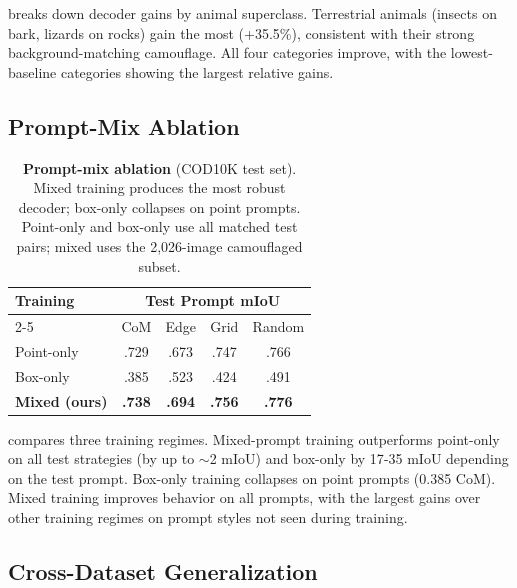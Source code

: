 \documentclass[10pt,twocolumn,letterpaper]{article}
\begin{document}
 breaks down decoder gains by animal superclass. Terrestrial animals (insects on bark, lizards on rocks) gain the most (+35.5\%), consistent with their strong background-matching camouflage. All four categories improve, with the lowest-baseline categories showing the largest relative gains.

\subsection{Prompt-Mix Ablation}

\begin{table}[t]
\centering
\caption{\textbf{Prompt-mix ablation} (COD10K test set). Mixed training produces the most robust decoder; box-only collapses on point prompts. Point-only and box-only use all matched test pairs; mixed uses the 2,026-image camouflaged subset.}
\label{tab:prompt_ablation_viscon}
\small
\begin{tabular}{lcccc}
\toprule
\multirow{2}{*}{Training} & \multicolumn{4}{c}{Test Prompt mIoU} \\
\cmidrule(lr){2-5}
 & CoM & Edge & Grid & Random \\
\midrule
Point-only & .729 & .673 & .747 & .766 \\
Box-only & .385 & .523 & .424 & .491 \\
\textbf{Mixed (ours)} & \textbf{.738} & \textbf{.694} & \textbf{.756} & \textbf{.776} \\
\bottomrule
\end{tabular}
\end{table}

 compares three training regimes. Mixed-prompt training outperforms point-only on all test strategies (by up to $\sim$2 mIoU) and box-only by 17{-}35 mIoU depending on the test prompt. Box-only training collapses on point prompts (0.385 CoM). Mixed training improves behavior on all prompts, with the largest gains over other training regimes on prompt styles not seen during training.

\subsection{Cross-Dataset Generalization}
\end{document}
